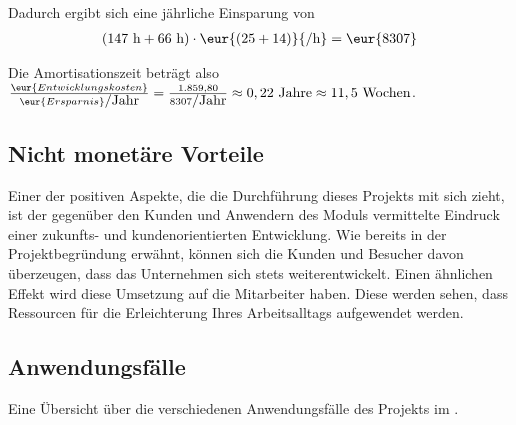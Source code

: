 Dadurch ergibt sich eine jährliche Einsparung von 
\begin{eqnarray}
(147 \mbox{ h} + 66 \mbox{ h}) \cdot \eur{(25 + 14)}{\mbox{/h}} = \eur{8307}
\end{eqnarray}

Die Amortisationszeit beträgt also $\frac{\eur{Entwicklungskosten}}{\eur{Ersparnis}\mbox{/Jahr}} = \frac{1.859,80}{8307\mbox{/Jahr}} \approx 0,22 \mbox{ Jahre} \approx 11,5 \mbox{ Wochen}$.


%

\subsection{Nicht monetäre Vorteile}
\label{sec:NichtmonotaereVorteile}
Einer der positiven Aspekte, die die Durchführung dieses Projekts mit sich zieht, ist der gegenüber den Kunden und Anwendern des Moduls vermittelte Eindruck einer zukunfts- und kundenorientierten Entwicklung.
Wie bereits in der Projektbegründung erwähnt, können sich die Kunden und Besucher davon überzeugen, dass das Unternehmen sich stets weiterentwickelt.
Einen ähnlichen Effekt wird diese Umsetzung auf die Mitarbeiter haben.
Diese werden sehen, dass Ressourcen für die Erleichterung Ihres Arbeitsalltags aufgewendet werden.


\subsection{Anwendungsfälle}
\label{sec:Anwendungsfaelle}
%
Eine Übersicht über die verschiedenen Anwendungsfälle des Projekts im .


